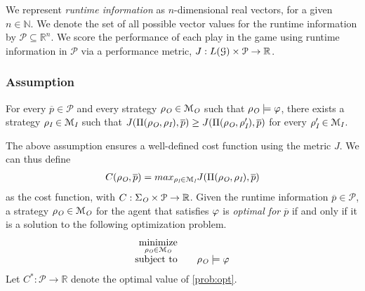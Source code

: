 We represent \emph{runtime information} as $n$-dimensional real vectors, for a given $n \in \mathbb N$. We denote the set of all possible vector values for the runtime information by $\mathcal{P}\subseteq \mathbb{R}^n$. We score the performance of each play in the game using runtime information in $\mathcal{P}$ via a performance metric, $J: L(\mathcal{G})\times\mathcal{P} \to \mathbb{R}$. 




\subsubsection*{Assumption}
For every $\overline p \in \mathcal{P}$ and every strategy $\rho_{\textit{O}}\in\mathcal{M}_{\textit{O}}$ such that $\rho_{\textit{O}}\models\varphi$, there exists a strategy $\rho_{\textit{I}} \in\mathcal{M}_{\textit{I}}$ such that $  J(\Pi(\rho_{\textit{O}},\rho_{\textit{I}}), \overline p) \geq J(\Pi(\rho_{\textit{O}},\rho_{\textit{I}}'), \overline p)$ for every $\rho_{\textit{I}}'\in\mathcal{M}_{\textit{I}}$. 

The above assumption ensures a well-defined cost function using the metric $J$. We can thus define
\begin{align}
C(\rho_{\textit{O}},\overline{p}) = max_{\rho_{\textit{I}} \in\mathcal{M}_{\textit{I}}}J(\Pi(\rho_{\textit{O}},\rho_{\textit{I}}), \overline p)
\end{align}
as the cost function, with $C:\Sigma_{\textit{O}} \times \mathcal{P} \to \mathbb{R}$.
Given the runtime information $\overline p \in \mathcal P$, a strategy $\rho_{\textit{O}} \in \mathcal M_{\textit{O}}$ for the agent that satisfies $\varphi$ is \emph{optimal for $\overline p$} if and only if it is a solution to the following optimization problem.
\begin{align}
    \begin{array}{rl}
        \underset{\rho_\out\in
        \mathcal{M}_\out}{\mathrm{minimize}}&\quad
        \ \\
        \mathrm{subject\ to}&\quad \rho_\out\models \varphi
    \end{array}\label{prob:opt}%
\end{align}
Let $C^\ast: \mathcal{P} \to \mathbb{R}$ denote the optimal value of \eqref{prob:opt}.


